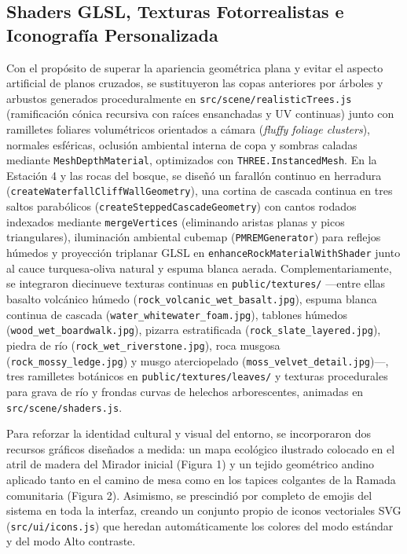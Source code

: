 \documentclass[12pt,letterpaper]{article}
\begin{document}
\subsection{Shaders GLSL, Texturas Fotorrealistas e Iconografía Personalizada}

Con el propósito de superar la apariencia geométrica plana y evitar el aspecto artificial de planos cruzados, se sustituyeron las copas anteriores por árboles y arbustos generados proceduralmente en \texttt{src/scene/realisticTrees.js} (ramificación cónica recursiva con raíces ensanchadas y UV continuas) junto con ramilletes foliares volumétricos orientados a cámara (\textit{fluffy foliage clusters}), normales esféricas, oclusión ambiental interna de copa y sombras caladas mediante \texttt{MeshDepthMaterial}, optimizados con \texttt{THREE.InstancedMesh}. En la Estación 4 y las rocas del bosque, se diseñó un farallón continuo en herradura (\texttt{createWaterfallCliffWallGeometry}), una cortina de cascada continua en tres saltos parabólicos (\texttt{createSteppedCascadeGeometry}) con cantos rodados indexados mediante \texttt{mergeVertices} (eliminando aristas planas y picos triangulares), iluminación ambiental cubemap (\texttt{PMREMGenerator}) para reflejos húmedos y proyección triplanar GLSL en \texttt{enhanceRockMaterialWithShader} junto al cauce turquesa-oliva natural y espuma blanca aerada. Complementariamente, se integraron diecinueve texturas continuas en \texttt{public/textures/} —entre ellas basalto volcánico húmedo (\texttt{rock\_volcanic\_wet\_basalt.jpg}), espuma blanca continua de cascada (\texttt{water\_whitewater\_foam.jpg}), tablones húmedos (\texttt{wood\_wet\_boardwalk.jpg}), pizarra estratificada (\texttt{rock\_slate\_layered.jpg}), piedra de río (\texttt{rock\_wet\_riverstone.jpg}), roca musgosa (\texttt{rock\_mossy\_ledge.jpg}) y musgo aterciopelado (\texttt{moss\_velvet\_detail.jpg})—, tres ramilletes botánicos en \texttt{public/textures/leaves/} y texturas procedurales para grava de río y frondas curvas de helechos arborescentes, animadas en \texttt{src/scene/shaders.js}.

Para reforzar la identidad cultural y visual del entorno, se incorporaron dos recursos gráficos diseñados a medida: un mapa ecológico ilustrado colocado en el atril de madera del Mirador inicial (Figura 1) y un tejido geométrico andino aplicado tanto en el camino de mesa como en los tapices colgantes de la Ramada comunitaria (Figura 2). Asimismo, se prescindió por completo de emojis del sistema en toda la interfaz, creando un conjunto propio de iconos vectoriales SVG (\texttt{src/ui/icons.js}) que heredan automáticamente los colores del modo estándar y del modo Alto contraste.
\end{document}
